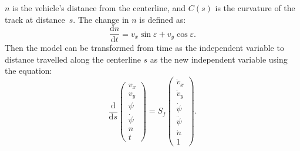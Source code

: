 $n$ is the vehicle's distance from the centerline, and $C(s)$ is the curvature of the track at distance~$s$. The change in $n$ is defined as:
\begin{equation}
	\frac{\mathrm{d}n}{\mathrm{d}t} = v_x \sin\varepsilon + v_y \cos\varepsilon.
\end{equation}
Then the model can be transformed from time as the independent variable to distance travelled along the centerline $s$ as the new independent variable using the equation:
\begin{equation}
	\frac{\mathrm{d}}{\mathrm{d}s}
	\begin{pmatrix} v_x \\ v_y \\ \psi \\ \dot{\psi} \\ n \\ t \end{pmatrix}
	=
	S_f
	\begin{pmatrix}
		\dot{v}_x    \\
		\dot{v}_y    \\
		\dot{\psi}   \\
		\ddot{\psi} \\
		\dot{n}      \\
		1
	\end{pmatrix}.
\end{equation}
